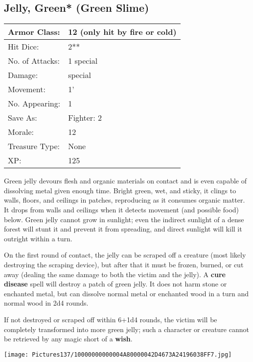 \documentclass[a4paper,twoside,openany,10pt]{book}
\begin{document}
\begin{multicols}{2}
\subsection*{Jelly, Green* (Green Slime)}\label{jelly-green-green-slime}

\begin{tabularx}{0.50\textwidth}{@{}lX@{}}
Armor Class: & 12 (only hit by fire or cold) \\\hline
Hit Dice: & 2** \\\hline
No. of Attacks: & 1 special \\\hline
Damage: & special \\\hline
Movement: & 1' \\\hline
No. Appearing: & 1 \\\hline
Save As: & Fighter: 2 \\\hline
Morale: & 12 \\\hline
Treasure Type: & None \\\hline
XP: & 125 \\\hline
\end{tabularx}\medskip

Green jelly devours flesh and organic materials on contact and is even capable of dissolving metal given enough time. Bright green, wet, and sticky, it clings to walls, floors, and ceilings in patches, reproducing as it consumes organic matter. It drops from walls and ceilings when it detects movement (and possible food) below. Green jelly cannot grow in sunlight; even the indirect sunlight of a dense forest will stunt it and prevent it from spreading, and direct sunlight will kill it outright within a turn.

On the first round of contact, the jelly can be scraped off a creature (most likely destroying the scraping device), but after that it must be frozen, burned, or cut away (dealing the same damage to both the victim and the jelly). A \textbf{cure disease} spell will destroy a patch of green jelly. It does not harm stone or enchanted metal, but can dissolve normal metal or enchanted wood in a turn and normal wood in 2d4 rounds.

If not destroyed or scraped off within 6+1d4 rounds, the victim will be completely transformed into more green jelly; such a character or creature cannot be retrieved by any magic short of a \textbf{wish}.

\begin{center} \texttt{[image: Pictures137/10000000000004A80000042D4673A24196038FF7.jpg]} \end{center}



\end{multicols}
\end{document}

